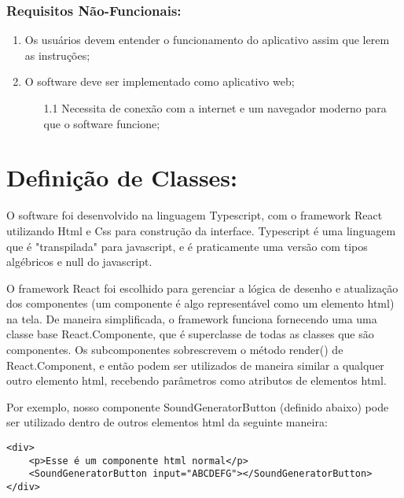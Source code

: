 \documentclass[12pt]{article}
\begin{document}
\subsubsection{Requisitos Não-Funcionais:}
    \begin{enumerate}
        \item Os usuários devem entender o funcionamento do aplicativo assim que lerem as instruções;
        \item O software deve ser implementado como aplicativo web;
        \begin{enumerate}
            \item[1.1] Necessita de conexão com a internet e um navegador moderno para que o software funcione;
        \end{enumerate}
    \end{enumerate}



\newpage



\section{Definição de Classes:}

O software foi desenvolvido na linguagem Typescript, com o framework React
utilizando Html e Css para construção da interface. Typescript é uma linguagem que é "transpilada" para javascript, e é praticamente uma versão com tipos algébricos e null do javascript. 

O framework React foi escolhido para gerenciar a lógica de desenho e atualização dos componentes (um componente é algo representável como um elemento html) na tela. De maneira simplificada, o framework funciona fornecendo uma uma classe base React.Componente, que é superclasse de todas as classes que são componentes. Os subcomponentes sobrescrevem o método render() de React.Component, e então podem ser utilizados de maneira similar a qualquer outro elemento html, recebendo parâmetros como atributos de elementos html. 

Por exemplo, nosso componente SoundGeneratorButton (definido abaixo) pode ser utilizado dentro de outros elementos html da seguinte maneira:

\begin{verbatim}
<div>
    <p>Esse é um componente html normal</p>
    <SoundGeneratorButton input="ABCDEFG"></SoundGeneratorButton>
</div>

\end{verbatim}
\end{document}
